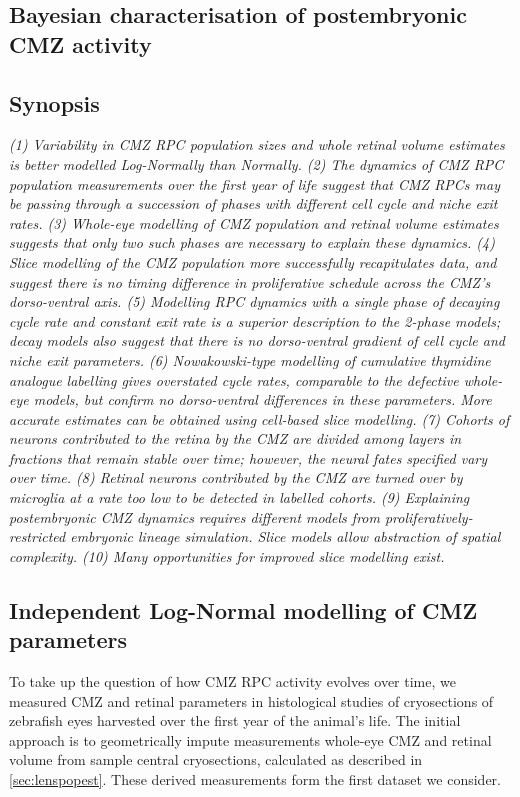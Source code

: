 \documentclass{ut-thesis}
\begin{document}
\begin{NoHyper}
\chapter{Bayesian characterisation of postembryonic CMZ activity}
\label{chap:CMZ}
\section*{Synopsis}
\textit{(1) Variability in CMZ RPC population sizes and whole retinal volume estimates is better modelled Log-Normally than Normally. (2) The dynamics of CMZ RPC population measurements over the first year of life suggest that CMZ RPCs may be passing through a succession of phases with different cell cycle and niche exit rates. (3) Whole-eye modelling of CMZ population and retinal volume estimates suggests that only two such phases are necessary to explain these dynamics. (4) Slice modelling of the CMZ population more successfully recapitulates data, and suggest there is no timing difference in proliferative schedule across the CMZ's dorso-ventral axis. (5) Modelling RPC dynamics with a single phase of decaying cycle rate and constant exit rate is a superior description to the 2-phase models; decay models also suggest that there is no dorso-ventral gradient of cell cycle and niche exit parameters. (6) Nowakowski-type modelling of cumulative thymidine analogue labelling gives overstated cycle rates, comparable to the defective whole-eye models, but confirm no dorso-ventral differences in these parameters. More accurate estimates can be obtained using cell-based slice modelling. (7) Cohorts of neurons contributed to the retina by the CMZ are divided among layers in fractions that remain stable over time; however, the neural fates specified vary over time. (8) Retinal neurons contributed by the CMZ are turned over by microglia at a rate too low to be detected in labelled cohorts. (9) Explaining postembryonic CMZ dynamics requires different models from proliferatively-restricted embryonic lineage simulation. Slice models allow abstraction of spatial complexity. (10) Many opportunities for improved slice modelling exist.}

\section{Independent Log-Normal modelling of CMZ parameters}
To take up the question of how CMZ RPC activity evolves over time, we measured CMZ and retinal parameters in histological studies of cryosections of zebrafish eyes harvested over the first year of the animal's life. The initial approach is to geometrically impute measurements whole-eye CMZ and retinal volume from sample central cryosections, calculated as described in \autoref{sec:lenspopest}. These derived measurements form the first dataset we consider.


\end{NoHyper}
\end{document}
